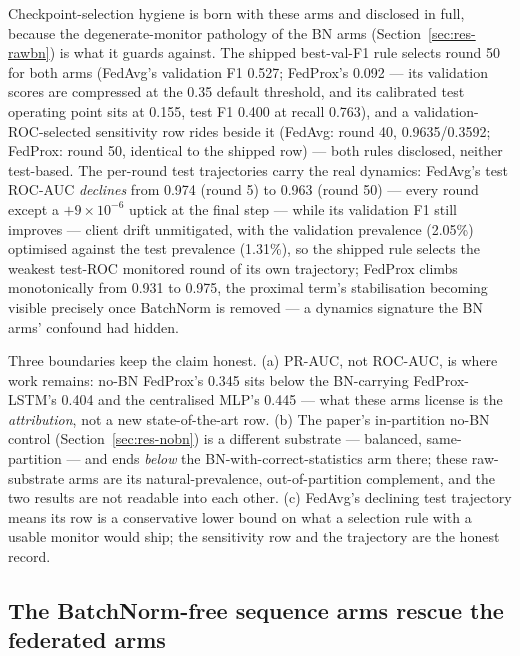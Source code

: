 Checkpoint-selection hygiene is born with these arms and disclosed
in full, because the degenerate-monitor pathology of the BN arms
(Section~\ref{sec:res-rawbn}) is what it guards against. The
shipped best-val-F1 rule selects round 50 for both arms (FedAvg's
validation F1 0.527; FedProx's 0.092 --- its validation scores are
compressed at the 0.35 default threshold, and its calibrated test
operating point sits at 0.155, test F1 0.400 at recall 0.763), and a
validation-ROC-selected sensitivity row rides beside it (FedAvg:
round 40, 0.9635/0.3592; FedProx: round 50, identical to the shipped
row) --- both rules disclosed, neither test-based. The per-round
test trajectories carry the real dynamics: FedAvg's test ROC-AUC
\emph{declines} from 0.974 (round 5) to 0.963 (round 50) --- every
round except a $+9\times10^{-6}$ uptick at the final step --- while
its validation F1 still improves --- client drift
unmitigated, with the validation prevalence (2.05\%) optimised
against the test prevalence (1.31\%), so the shipped rule selects
the weakest test-ROC monitored round of its own trajectory; FedProx
climbs monotonically from 0.931 to 0.975, the proximal term's
stabilisation becoming visible precisely once BatchNorm is removed
--- a dynamics signature the BN arms' confound had hidden.

Three boundaries keep the claim honest. (a) PR-AUC, not ROC-AUC, is
where work remains: no-BN FedProx's 0.345 sits below the
BN-carrying FedProx-LSTM's 0.404 and the centralised MLP's 0.445 ---
what these arms license is the \emph{attribution}, not a new
state-of-the-art row. (b) The paper's in-partition no-BN control
(Section~\ref{sec:res-nobn}) is a different substrate --- balanced,
same-partition --- and ends \emph{below} the
BN-with-correct-statistics arm there; these raw-substrate arms are
its natural-prevalence, out-of-partition complement, and the two
results are not readable into each other. (c) FedAvg's declining
test trajectory means its row is a conservative lower bound on what
a selection rule with a usable monitor would ship; the sensitivity
row and the trajectory are the honest record.

\subsection{The BatchNorm-free sequence arms rescue the federated
arms}
\label{sec:res-lstm}

